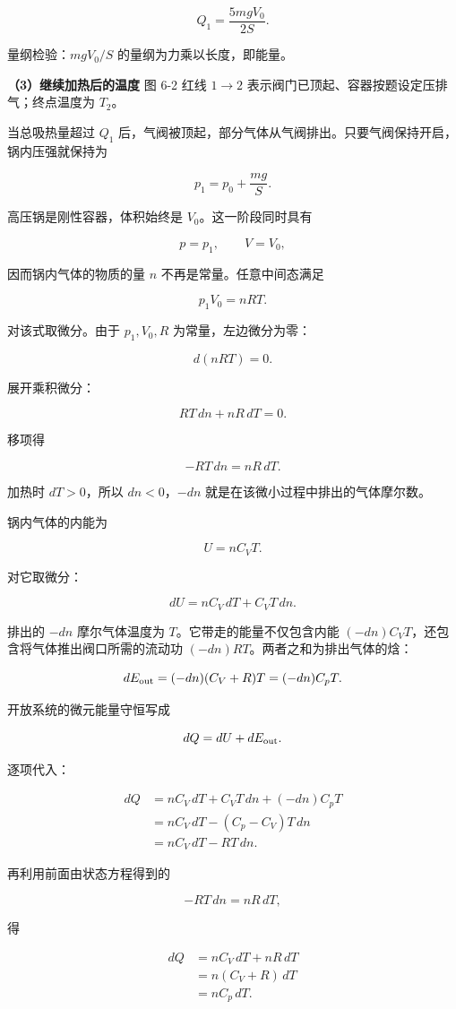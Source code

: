 \documentclass[12pt,a4paper,UTF8]{ctexart}
\begin{document}
\[\boxed{Q_1=\frac{5mgV_0}{2S}}.\]

量纲检验：\(mgV_0/S\) 的量纲为力乘以长度，即能量。

\textbf{（3）继续加热后的温度} 图 6-2 红线 \(1\to2\)
表示阀门已顶起、容器按题设定压排气；终点温度为 \(T_2\)。

当总吸热量超过 \(Q_1\)
后，气阀被顶起，部分气体从气阀排出。只要气阀保持开启，锅内压强就保持为

\[p_1=p_0+\frac{mg}{S}.\]

高压锅是刚性容器，体积始终是 \(V_0\)。这一阶段同时具有

\[p=p_1,\qquad V=V_0,\]

因而锅内气体的物质的量 \(n\) 不再是常量。任意中间态满足

\[p_1V_0=nRT.\]

对该式取微分。由于 \(p_1,V_0,R\) 为常量，左边微分为零：

\[d(nRT)=0.\]

展开乘积微分：

\[RT\,dn+nR\,dT=0.\]

移项得

\[-RT\,dn=nR\,dT.\]

加热时 \(dT>0\)，所以 \(dn<0\)，\(-dn\)
就是在该微小过程中排出的气体摩尔数。

锅内气体的内能为

\[U=nC_VT.\]

对它取微分：

\[dU=nC_V\,dT+C_VT\,dn.\]

排出的 \(-dn\) 摩尔气体温度为 \(T\)。它带走的能量不仅包含内能
\((-dn)C_VT\)，还包含将气体推出阀口所需的流动功
\((-dn)RT\)。两者之和为排出气体的焓：

\[dE_{\rm out}=(-dn)(C_V+R)T=(-dn)C_pT.\]

开放系统的微元能量守恒写成

\[dQ=dU+dE_{\rm out}.\]

逐项代入：

\[\begin{aligned}
dQ
&=nC_V\,dT+C_VT\,dn+(-dn)C_pT\\
&=nC_V\,dT-(C_p-C_V)T\,dn\\
&=nC_V\,dT-RT\,dn.
\end{aligned}\]

再利用前面由状态方程得到的

\[-RT\,dn=nR\,dT,\]

得

\[\begin{aligned}
dQ
&=nC_V\,dT+nR\,dT\\
&=n(C_V+R)\,dT\\
&=nC_p\,dT.
\end{aligned}\]
\end{document}
